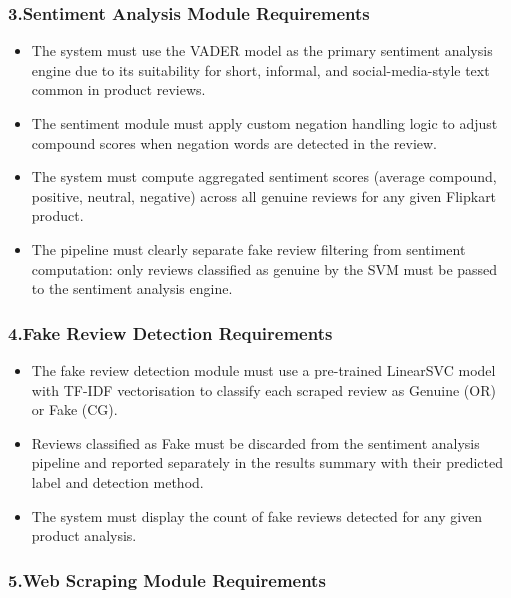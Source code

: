 \documentclass[12pt,a4paper]{report}
\begin{document}
\subsubsection*{3.\quad Sentiment Analysis Module Requirements}

\begin{itemize}
  \item The system must use the VADER model as the primary sentiment analysis engine due to its suitability for short, informal, and social-media-style text common in product reviews.

  \item The sentiment module must apply custom negation handling logic to adjust compound scores when negation words are detected in the review.

  \item The system must compute aggregated sentiment scores (average compound, positive, neutral, negative) across all genuine reviews for any given Flipkart product.

  \item The pipeline must clearly separate fake review filtering from sentiment computation: only reviews classified as genuine by the SVM must be passed to the sentiment analysis engine.
\end{itemize}

\subsubsection*{4.\quad Fake Review Detection Requirements}

\begin{itemize}
  \item The fake review detection module must use a pre-trained LinearSVC model with TF-IDF vectorisation to classify each scraped review as Genuine (OR) or Fake (CG).

  \item Reviews classified as Fake must be discarded from the sentiment analysis pipeline and reported separately in the results summary with their predicted label and detection method.

  \item The system must display the count of fake reviews detected for any given product analysis.
\end{itemize}

\subsubsection*{5.\quad Web Scraping Module Requirements}
\end{document}
